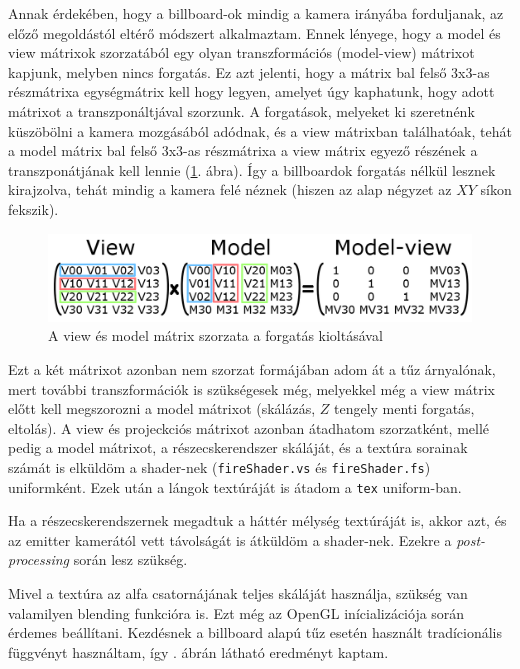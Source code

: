 Annak érdekében, hogy a billboard-ok mindig a kamera irányába forduljanak, az előző megoldástól eltérő módszert alkalmaztam. Ennek lényege, hogy a model és view mátrixok szorzatából egy olyan transzformációs (model-view) mátrixot kapjunk, melyben nincs forgatás. Ez azt jelenti, hogy a mátrix bal felső 3x3-as részmátrixa egységmátrix kell hogy legyen, amelyet úgy kaphatunk, hogy adott mátrixot a transzponáltjával szorzunk. A forgatások, melyeket ki szeretnénk küszöbölni a kamera mozgásából adódnak, és a view mátrixban találhatóak, tehát a model mátrix bal felső 3x3-as részmátrixa a view mátrix egyező részének a transzponátjának kell lennie (\ref{fig:matrixRotation}. ábra). Így a billboardok forgatás nélkül lesznek kirajzolva, tehát mindig a kamera felé néznek (hiszen az alap négyzet az $XY$ síkon fekszik).
\begin{figure}[h]
 \centering
 \includegraphics[width=\textwidth]{kepek/matrixRotation.png}
 \caption{A view és model mátrix szorzata a forgatás kioltásával}
 \label{fig:matrixRotation}
\end{figure}
Ezt a két mátrixot azonban nem szorzat formájában adom át a tűz árnyalónak, mert további transzformációk is szükségesek még, melyekkel még a view mátrix előtt kell megszorozni a model mátrixot (skálázás, $Z$ tengely menti forgatás, eltolás). A view és projeckciós mátrixot azonban átadhatom szorzatként, mellé pedig a model mátrixot, a részecskerendszer skáláját, és a textúra sorainak számát is elküldöm a shader-nek (\texttt{fireShader.vs} és \texttt{fireShader.fs}) uniformként. Ezek után a lángok textúráját is átadom a \texttt{tex} uniform-ban. 

Ha a részecskerendszernek megadtuk a háttér mélység textúráját is, akkor azt, és az emitter kamerától vett távolságát is átküldöm a shader-nek. Ezekre a \textit{post-processing} során lesz szükség.

Mivel a textúra az alfa csatornájának teljes skáláját használja, szükség van valamilyen blending funkcióra is. Ezt még az OpenGL inícializációja során érdemes beállítani. Kezdésnek a billboard alapú tűz esetén használt tradícionális függvényt használtam, így . ábrán látható eredményt kaptam.

